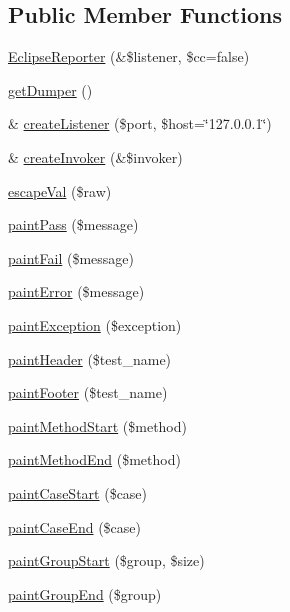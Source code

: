 \subsection*{Public Member Functions}
\begin{DoxyCompactItemize}
\item 
\hyperlink{class_eclipse_reporter_a5e0133f2567d2c9eaf189668a4522840}{EclipseReporter} (\&\$listener, \$cc=false)
\item 
\hyperlink{class_eclipse_reporter_a2aa6ddec17077eebcf3a02e7a64aa71a}{getDumper} ()
\item 
\& \hyperlink{class_eclipse_reporter_a2911a8f03f2ae8f218a1bff0410115d6}{createListener} (\$port, \$host=\char`\"{}127.0.0.1\char`\"{})
\item 
\& \hyperlink{class_eclipse_reporter_a251879a7dcdbaf023091c18dce8d58f2}{createInvoker} (\&\$invoker)
\item 
\hyperlink{class_eclipse_reporter_a811324a8cd4e559d2f0c8dd12eafd0ac}{escapeVal} (\$raw)
\item 
\hyperlink{class_eclipse_reporter_a845512e7138f1f8f1fc4a710d0e4960f}{paintPass} (\$message)
\item 
\hyperlink{class_eclipse_reporter_a0b040a0e5cb9d9ac50a33e9df8a7cc57}{paintFail} (\$message)
\item 
\hyperlink{class_eclipse_reporter_a54b5dd27926ce2bed0e1d4886460fe47}{paintError} (\$message)
\item 
\hyperlink{class_eclipse_reporter_aebbe55b20bc08df87eb01823113dd7f1}{paintException} (\$exception)
\item 
\hyperlink{class_eclipse_reporter_a050de6302927aea46cae03b72b6d1c0b}{paintHeader} (\$test\_\-name)
\item 
\hyperlink{class_eclipse_reporter_a7afc6971e74282f43d57245bffc93594}{paintFooter} (\$test\_\-name)
\item 
\hyperlink{class_eclipse_reporter_a3beefc3a53542af1e4eb1dbca13a69fb}{paintMethodStart} (\$method)
\item 
\hyperlink{class_eclipse_reporter_a1322beebd54bfec26b6453b4e7a23d68}{paintMethodEnd} (\$method)
\item 
\hyperlink{class_eclipse_reporter_a3417bc5902a1ca59ec14d64707cf15b2}{paintCaseStart} (\$case)
\item 
\hyperlink{class_eclipse_reporter_a37e47c84707faeb87d1dcf946c1681f6}{paintCaseEnd} (\$case)
\item 
\hyperlink{class_eclipse_reporter_a80a6d39b62ad92ee63da0c0b3011c294}{paintGroupStart} (\$group, \$size)
\item 
\hyperlink{class_eclipse_reporter_aa0cb1e290d9ea75c0ac19efe06b55992}{paintGroupEnd} (\$group)
\end{DoxyCompactItemize}


